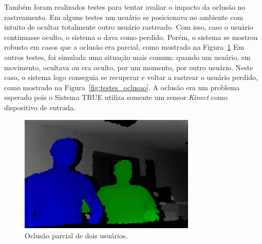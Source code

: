	Também foram realizados testes para tentar avaliar o impacto da oclusão no rastreamento. Em alguns testes um usuário se posicionava no ambiente com intuito de ocultar totalmente outro usuário rastreado. Com isso, caso o usuário continuasse oculto, o sistema o dava como perdido. Porém, o sistema se mostrou robusto em casos que a oclusão era parcial, como mostrado na Figura~\ref{fig:testes_oclusao_sucesso} Em outros testes, foi simulada uma situação mais comum: quando um usuário, em movimento, ocultava ou era oculto, por um momento, por outro usuário. Neste caso, o sistema logo conseguia se recuperar e voltar a rastrear o usuário perdido, como mostrado na Figura~\ref{fig:testes_oclusao}. A oclusão era um problema esperado pois o Sistema TRUE utiliza somente um sensor \textit{Kinect} como dispositivo de entrada.
		
\begin{figure}[htb]
			\begin{center}
				\includegraphics[width=0.75\textwidth]{figuras/5.Testes/oclusao/oclusao_corretamente.png}
			\end{center}
			\caption{Oclusão parcial de dois usuários.}
			\label{fig:testes_oclusao_sucesso}
		\end{figure}
	
